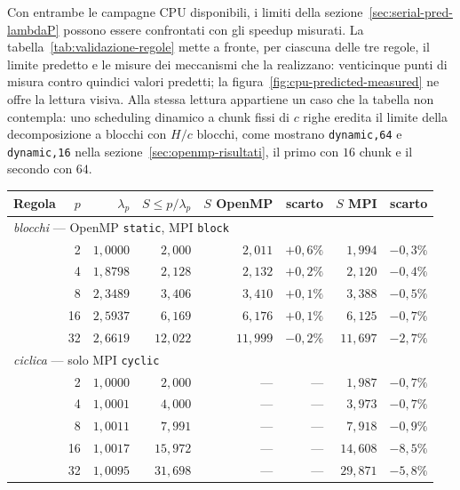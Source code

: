 Con entrambe le campagne CPU disponibili, i limiti della
sezione~\ref{sec:serial-pred-lambdaP} possono essere confrontati con gli speedup
misurati. La tabella~\ref{tab:validazione-regole} mette a fronte, per ciascuna
delle tre regole, il limite predetto e le misure dei meccanismi che la
realizzano: venticinque punti di misura contro quindici valori predetti; la
figura~\ref{fig:cpu-predicted-measured} ne offre la lettura visiva. Alla
stessa lettura appartiene un caso che la tabella non contempla: uno scheduling
dinamico a chunk fissi di $c$ righe eredita il limite della decomposizione a
blocchi con $H/c$ blocchi, come mostrano \texttt{dynamic,64} e
\texttt{dynamic,16} nella sezione~\ref{sec:openmp-risultati}, il primo con $16$
chunk e il secondo con $64$.
\vspace{2,5mm}
\begin{table}[htbp]
    \centering
    \begin{tabular}{lrrrrrrr}
        \hline
        Regola & $p$ & $\lambda_p$ & $S \le p/\lambda_p$ &
        $S$ OpenMP & scarto & $S$ MPI & scarto \\
        \hline
        \multicolumn{8}{l}{\emph{blocchi} --- OpenMP \texttt{static}, MPI \texttt{block}} \\
        & 2  & $1{,}0000$ & $2{,}000$  & $2{,}011$  & $+0{,}6\%$ & $1{,}994$  & $-0{,}3\%$ \\
        & 4  & $1{,}8798$ & $2{,}128$  & $2{,}132$  & $+0{,}2\%$ & $2{,}120$  & $-0{,}4\%$ \\
        & 8  & $2{,}3489$ & $3{,}406$  & $3{,}410$  & $+0{,}1\%$ & $3{,}388$  & $-0{,}5\%$ \\
        & 16 & $2{,}5937$ & $6{,}169$  & $6{,}176$  & $+0{,}1\%$ & $6{,}125$  & $-0{,}7\%$ \\
        & 32 & $2{,}6619$ & $12{,}022$ & $11{,}999$ & $-0{,}2\%$ & $11{,}697$ & $-2{,}7\%$ \\
        \hline
        \multicolumn{8}{l}{\emph{ciclica} --- solo MPI \texttt{cyclic}} \\
        & 2  & $1{,}0000$ & $2{,}000$  & --- & --- & $1{,}987$  & $-0{,}7\%$ \\
        & 4  & $1{,}0001$ & $4{,}000$  & --- & --- & $3{,}973$  & $-0{,}7\%$ \\
        & 8  & $1{,}0011$ & $7{,}991$  & --- & --- & $7{,}918$  & $-0{,}9\%$ \\
        & 16 & $1{,}0017$ & $15{,}972$ & --- & --- & $14{,}608$ & $-8{,}5\%$ \\
        & 32 & $1{,}0095$ & $31{,}698$ & --- & --- & $29{,}871$ & $-5{,}8\%$ \\

\end{tabular}
\end{table}
